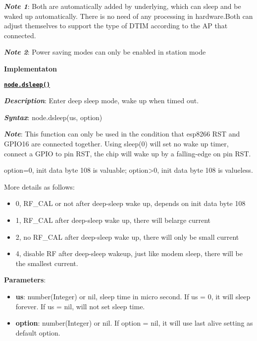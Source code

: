 \documentclass[16pt]{article}
\begin{document}
\textbf{\emph{Note 1}}: Both are automatically added by underlying, which
can sleep and be waked up automatically. There is no need of any
processing in hardware.Both can adjust themselves to support the type of
DTIM according to the AP that connected.

\vspace{0.1cm}

\textbf{\emph{Note 2}}: Power saving modes can only be enabled in station
mode

\vspace{0.6cm}

{\Large{\textbf{Implementaton}}}

\vspace{0.3cm}

{\underline{\texttt{\textbf{node.dsleep()}}}}

\vspace{0.3cm}

\textbf{\emph{Description}}: Enter deep sleep mode, wake up when timed out.

\textbf{\emph{Syntax}}: node.dsleep(us, option)

\textbf{\emph{Note}}: This function can only be used in the condition that
esp8266 RST and GPIO16 are connected together. Using sleep(0) will set
no wake up timer, connect a GPIO to pin RST, the chip will wake up by a
falling-edge on pin RST.

option=0, init data byte 108 is valuable; option\textgreater{}0, init
data byte 108 is valueless.

More details as follows: 
\begin{itemize}
\item 0, RF\_CAL or not after deep-sleep wake up, depends on init data byte 108
\item 1, RF\_CAL after deep-sleep wake up, there will belarge current
\item 2, no RF\_CAL after deep-sleep wake up, there will only be small current 
\item 4, disable RF after deep-sleep wakeup, just like modem sleep, there will be the smallest current.
\end{itemize}

\textbf{Parameters}:

\begin{itemize}

\item
  \textbf{us}: number(Integer) or nil, sleep time in micro second. If us
  = 0, it will sleep forever. If us = nil, will not set sleep time.
\item
  \textbf{option}: number(Integer) or nil. If option = nil, it will use
  last alive setting as default option.
\end{itemize}
\end{document}
